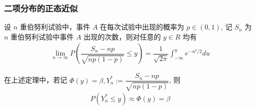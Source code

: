 \documentclass[Prob-All.tex]{subfiles}
\begin{document}




\begin{frame}
	\frametitle{二项分布的正态近似}
	\begin{thm} 设 $n$ 重伯努利试验中，事件 $A$ 在每次试验中出现的概率为 $p\in (0,1)$, 记 $S_n$ 为 $n$ 重伯努利试验中事件 $A$ 出现的次数，则对任意的 $y\in R$ 均有
		\begin{eqnarray*}
			\lim_{n\rightarrow\infty}P(\dfrac{S_n-np}{\sqrt{np(1-p)}}\le y)=\dfrac{1}{\sqrt{2\pi}}\int_{-\infty}^ye^{-u^2/2}du
		\end{eqnarray*}

	\end{thm}
	\pause 在上述定理中，若记 $\Phi (y)=\beta, Y_n^*:=\dfrac{S_n-np}{\sqrt{np (1-p)}}$, 则
	\begin{eqnarray*}
		P(Y_n^*\le y)\approx \Phi(y)=\beta
	\end{eqnarray*}


\end{frame}
\end{document}
